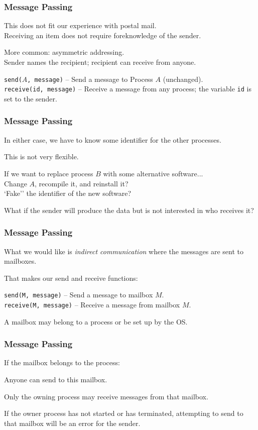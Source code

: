 \begin{frame}
\frametitle{Message Passing}

This does not fit our experience with postal mail.\\
\quad Receiving an item does not require foreknowledge of the sender.

More common: asymmetric addressing.\\
\quad Sender names the recipient; recipient can receive from anyone.

\texttt{send($A$, message)} -- Send a message to Process $A$ (unchanged).\\
\texttt{receive(id, message)} -- Receive a message from any process; the variable \texttt{id} is set to the sender.

\end{frame}

\begin{frame}
\frametitle{Message Passing}

In either case, we have to know some identifier for the other processes. 

This is not very flexible.

If we want to replace process $B$ with some alternative software...\\
\quad Change $A$, recompile it, and reinstall it?\\
\quad `Fake'' the identifier of the new software? 

What if the sender will produce the data but is not interested in who receives it?

\end{frame}

\begin{frame}
\frametitle{Message Passing}

What we would like is \textit{indirect communication} where the messages are sent to mailboxes. 

That makes our send and receive functions:

\texttt{send(M, message)} -- Send a message to mailbox $M$.\\
\texttt{receive(M, message)} -- Receive a message from mailbox $M$.

A mailbox may belong to a process or be set up by the OS.

\end{frame}

\begin{frame}
\frametitle{Message Passing}
If the mailbox belongs to the process: 

Anyone can send to this mailbox. 

Only the owning process may receive messages from that mailbox. 

If the owner process has not started or has terminated, attempting to send to that mailbox will be an error for the sender.

\end{frame}

